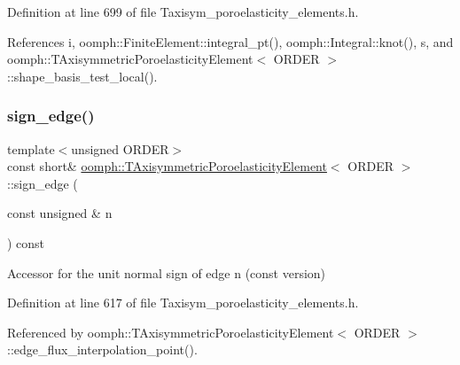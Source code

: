 Definition at line 699 of file Taxisym\+\_\+poroelasticity\+\_\+elements.\+h.



References i, oomph\+::\+Finite\+Element\+::integral\+\_\+pt(), oomph\+::\+Integral\+::knot(), s, and oomph\+::\+T\+Axisymmetric\+Poroelasticity\+Element$<$ O\+R\+D\+E\+R $>$\+::shape\+\_\+basis\+\_\+test\+\_\+local().

\mbox{\label{classoomph_1_1TAxisymmetricPoroelasticityElement_aa78f2091846d6ec114e2a75631b512d4}} 
\subsubsection{\texorpdfstring{sign\+\_\+edge()}{sign\_edge()}\hspace{0.1cm}{\footnotesize\ttfamily [1/2]}}
{\footnotesize\ttfamily template$<$unsigned O\+R\+D\+ER$>$ \\
const short\& \hyperlink{classoomph_1_1TAxisymmetricPoroelasticityElement}{oomph\+::\+T\+Axisymmetric\+Poroelasticity\+Element}$<$ O\+R\+D\+ER $>$\+::sign\+\_\+edge (\begin{DoxyParamCaption}\item[{const unsigned \&}]{n }\end{DoxyParamCaption}) const\hspace{0.3cm}{\ttfamily [inline]}}



Accessor for the unit normal sign of edge n (const version) 



Definition at line 617 of file Taxisym\+\_\+poroelasticity\+\_\+elements.\+h.



Referenced by oomph\+::\+T\+Axisymmetric\+Poroelasticity\+Element$<$ O\+R\+D\+E\+R $>$\+::edge\+\_\+flux\+\_\+interpolation\+\_\+point().

\mbox{\label{classoomph_1_1TAxisymmetricPoroelasticityElement_a2f1338647177379af3d5cc4b9c552fb9}} 
